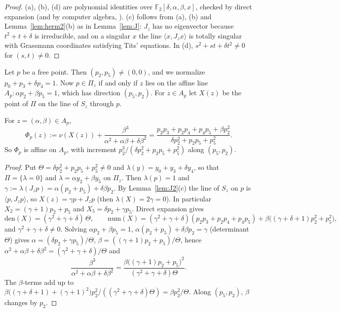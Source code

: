 \begin{proof}
(a), (b), (d) are polynomial identities over $\mathbb{F}_2[\delta,\alpha,\beta,x]$, checked by direct expansion (and by computer algebra, ). (c) follows from (a), (b) and Lemma~\ref{lem:herm2}(b) as in Lemma~\ref{lem:J}: $J_z$ has no eigenvector because $t^2+t+\delta$ is irreducible, and on a singular $x$ the line $\langle x,J_zx\rangle$ is totally singular with Grassmann coordinates satisfying Tits' equations. In (d), $s^2+st+\delta t^2\ne0$ for $(s,t)\ne0$.
\end{proof}

Let $p$ be a free point. Then $(p_2,p_5)\ne(0,0)$, and we normalize $p_0+p_3+\delta p_4=1$. Now $p\in\Pi_z$ if and only if $z$ lies on the affine line $A_p\colon\alpha p_2+\beta p_5=1$, which has direction $(p_5,p_2)$. For $z\in A_p$ let $X(z)$ be the point of $\Pi$ on the line of $S_z$ through $p$.

\begin{lemma}\label{lem:key2}
For $z=(\alpha,\beta)\in A_p$,
\[
\Phi_p(z):=\nu(X(z))+\frac{\beta^3}{\alpha^2+\alpha\beta+\delta\beta^2}=\frac{p_2p_3+p_2p_4+p_4p_5+\beta p_2^2}{\delta p_2^2+p_2p_5+p_5^2}.
\]
So $\Phi_p$ is affine on $A_p$, with increment $p_2^3/(\delta p_2^2+p_2p_5+p_5^2)$ along $(p_5,p_2)$.
\end{lemma}

\begin{proof}
Put $\Theta=\delta p_2^2+p_2p_5+p_5^2\ne0$ and $\lambda(y)=y_0+y_3+\delta y_4$, so that $\Pi=\{\lambda=0\}$ and $\lambda=\alpha y_2+\beta y_5$ on $\Pi_z$. Then $\lambda(p)=1$ and $\gamma:=\lambda(J_zp)=\alpha(p_2+p_5)+\delta\beta p_2$. By Lemma~\ref{lem:J2}(c) the line of $S_z$ on $p$ is $\langle p,J_zp\rangle$, so $X(z)=\gamma p+J_zp$ (then $\lambda(X)=2\gamma=0$). In particular $X_2=(\gamma+1)p_2+p_5$ and $X_5=\delta p_2+\gamma p_5$. Direct expansion gives
\[
\mathrm{den}(X)=(\gamma^2+\gamma+\delta)\,\Theta,\qquad
\mathrm{num}(X)=(\gamma^2+\gamma+\delta)(p_2p_3+p_2p_4+p_4p_5)+\beta\bigl((\gamma+\delta+1)p_2^2+p_5^2\bigr),
\]
and $\gamma^2+\gamma+\delta\ne0$. Solving $\alpha p_2+\beta p_5=1$, $\alpha(p_2+p_5)+\delta\beta p_2=\gamma$ (determinant $\Theta$) gives $\alpha=(\delta p_2+\gamma p_5)/\Theta$, $\beta=((\gamma+1)p_2+p_5)/\Theta$, hence $\alpha^2+\alpha\beta+\delta\beta^2=(\gamma^2+\gamma+\delta)/\Theta$ and
\[
\frac{\beta^3}{\alpha^2+\alpha\beta+\delta\beta^2}=\frac{\beta\bigl((\gamma+1)p_2+p_5\bigr)^2}{(\gamma^2+\gamma+\delta)\Theta}.
\]
The $\beta$-terms add up to $\beta\bigl((\gamma+\delta+1)+(\gamma+1)^2\bigr)p_2^2/((\gamma^2+\gamma+\delta)\Theta)=\beta p_2^2/\Theta$. Along $(p_5,p_2)$, $\beta$ changes by $p_2$.
\end{proof}

